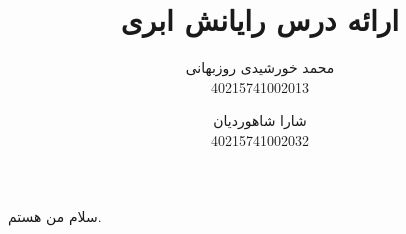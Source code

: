 \documentclass{book}
\title{ارائه درس رایانش ابری}
\author{محمد خورشیدی روزبهانی\\40215741002013 \and شارا شاهوردیان\\40215741002032}
\date{}
\begin{document}
    \maketitle

    \tableofcontents

    سلام من هستم.
\end{document}
